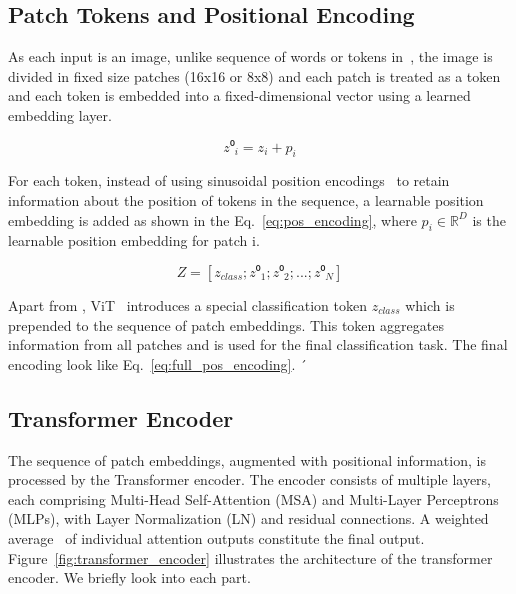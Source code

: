 \subsection{Patch Tokens and Positional Encoding}

As each input is an image, unlike sequence of words or tokens in~\cite{vaswani2023attentionneed}, the image is divided in fixed size patches (16x16 or 8x8) and each patch is treated as a token and each token is embedded into a fixed-dimensional vector using a learned embedding layer.

\begin{equation}
	\label{eq:pos_encoding}
	z⁰_i = z_i + p_i
\end{equation} 

For each token, instead of using sinusoidal position encodings~\cite{vaswani2023attentionneed} to retain information about the position of tokens in the sequence, a learnable position embedding is added as shown in the Eq.~\ref{eq:pos_encoding}, where \(p_i \in \mathbb{R}^{D}\) is the learnable position embedding for patch i. 

\begin{equation}
	\label{eq:full_pos_encoding}
	Z = [z_{class}; z⁰_1; z⁰_2;...; z⁰_N]
\end{equation}

Apart from \cite{vaswani2023attentionneed}, ViT~\cite{dosovitskiy2020image} introduces a special classification token \(z_{class}\) which is prepended to the sequence of patch embeddings. This token aggregates information from all patches and is used for the final classification task. The final encoding look like Eq.~\ref{eq:full_pos_encoding}.
´
\subsection{Transformer Encoder}
The sequence of patch embeddings, augmented with positional information, is processed by the Transformer encoder. The encoder consists of multiple layers, each comprising Multi-Head Self-Attention (MSA) and Multi-Layer Perceptrons (MLPs), with Layer Normalization (LN) and residual connections. A weighted average~\cite{weng2020transformer} of individual attention outputs constitute the final output. Figure~\ref{fig:transformer_encoder} illustrates the architecture of the transformer encoder. We briefly look into each part.


